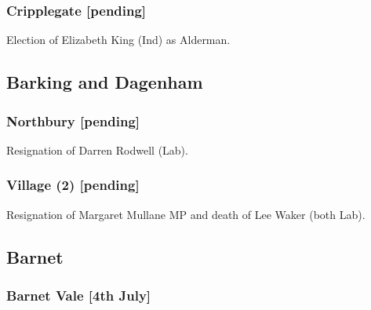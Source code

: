 \documentclass[a4paper,openany]{book}
\begin{document}
\begin{resultsiii}
\subsubsection*{Cripplegate \hspace*{\fill}\nolinebreak[1]%
	\enspace\hspace*{\fill}
	[pending]}


Election of Elizabeth King (Ind) as Alderman.

\subsection*{Barking and Dagenham}

\subsubsection*{Northbury \hspace*{\fill}\nolinebreak[1]%
	\enspace\hspace*{\fill}
	[pending]}


Resignation of Darren Rodwell (Lab).

\subsubsection*{Village (2) \hspace*{\fill}\nolinebreak[1]%
	\enspace\hspace*{\fill}
	[pending]}


Resignation of Margaret Mullane MP and death of Lee Waker (both Lab).

\subsection*{Barnet}

\subsubsection*{Barnet Vale \hspace*{\fill}\nolinebreak[1]%
	\enspace\hspace*{\fill}
	[4th July]}


\end{resultsiii}
\end{document}
